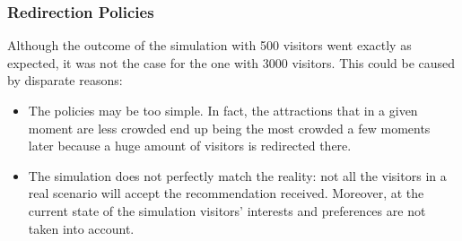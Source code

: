 \begin{frame}
    \frametitle{Redirection Policies}
    Although the outcome of the simulation with 500 visitors went exactly as expected, it was not the case for the one with 3000 visitors.
    This could be caused by disparate reasons:
    \begin{itemize}
        \item The policies may be too simple.
        In fact, the attractions that in a given moment are less crowded end up being the most crowded a few moments later because a huge amount of visitors is redirected there.
        \item The simulation does not perfectly match the reality: not all the visitors in a real scenario will accept the recommendation received.
        Moreover, at the current state of the simulation visitors’ interests and preferences are not taken into account.
    \end{itemize}

\end{frame}


